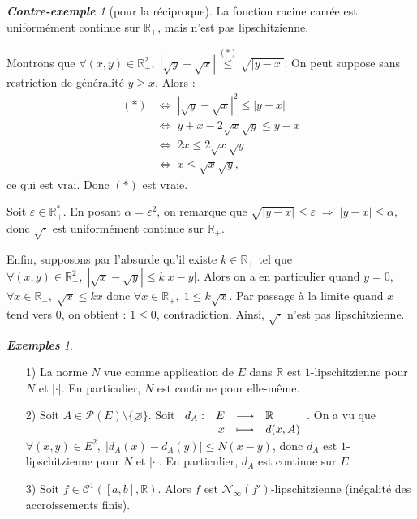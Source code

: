 \documentclass[12pt]{book}
\let\ensembleNombre\mathbb
\newcommand*\R{\ensuremath{\ensembleNombre{R}}}
\newcommand{\app}[5]{\ensuremath{
\begin{array}[t]{lrcl}
#1 : & #2 & \longrightarrow & #3 \\
    & #4 & \longmapsto & #5 \end{array}
}}
\theoremstyle{definition}
\theoremstyle{remark}
\newtheorem*{exs}{\textbf{Exemples}}
\newtheorem*{cex}{\textbf{Contre-exemple}}
\begin{document}
	\begin{cex}[pour la réciproque]
	La fonction racine carrée est uniformément continue sur $\R_+$, mais n'est pas lipschitzienne.
	
	Montrons que $\forall (x,y) \in \R_+^2,\; |\sqrt y - \sqrt x| \overset{(*)}{\leq} \sqrt{|y-x|}$. On peut suppose sans restriction de généralité $y \geq x$. Alors :
	\begin{align*}
	(*) &\Longleftrightarrow\; |\sqrt y - \sqrt x |^2 \leq |y-x| \\
	&\Longleftrightarrow\; y + x - 2 \sqrt x \sqrt y \leq y - x \\
	&\Longleftrightarrow\; 2x \leq 2 \sqrt x \sqrt y \\
	&\Longleftrightarrow\; x \leq \sqrt x \sqrt y,
	\end{align*}
	ce qui est vrai. Donc $(*)$ est vraie.
	
	Soit $\varepsilon \in \R_+^*$. En posant $\alpha = \varepsilon^2$, on remarque que $\sqrt{|y - x|} \leq \varepsilon \;\Longrightarrow \; |y-x| \leq \alpha$, donc $\sqrt \cdot$ est uniformément continue sur $\R_+$.
	
	Enfin, supposons par l'absurde qu'il existe $k \in \R_+$ tel que $\forall (x,y) \in \R_+^2,\; |\sqrt x - \sqrt y | \leq k|x-y|$. Alors on a en particulier quand $y = 0$, $\forall x \in \R_+,\; \sqrt x \leq kx$ donc $\forall x \in \R_+,\; 1 \leq k\sqrt x$. Par passage à la limite quand $x$ tend vers $0$, on obtient : $1 \leq 0$, contradiction. Ainsi, $\sqrt \cdot$ n'est pas lipschitzienne.
	\end{cex}
	
	\begin{exs}\mbox{~}\\
	\begin{itemize}
	\item[1)] La norme $N$ vue comme application de $E$ dans $\R$ est $1$-lipschitzienne pour $N$ et $|\cdot|$. En particulier, $N$ est continue pour elle-même.
	\item[2)] Soit $A \in \mathcal P(E) \setminus \lbrace \varnothing \rbrace$. Soit $\app{d_A}{E}{\R}{x}{d(x,A)}$. On a vu que $\forall (x,y) \in E^2,\; |d_A(x) - d_A(y)| \leq N(x-y)$, donc $d_A$ est $1$-lipschitzienne pour $N$ et $|\cdot|$. En particulier, $d_A$ est continue sur $E$.
	\item[3)] Soit $f \in \mathcal C^1([a,b], \R)$. Alors $f$ est $\mathcal N_{\infty}(f')$-lipschitzienne (inégalité des accroissements finis).
	\end{itemize}
	\end{exs}
	
\end{document}
